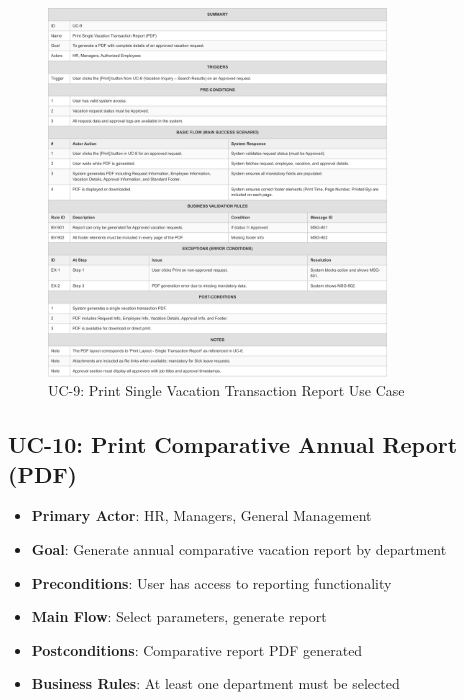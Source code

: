 \documentclass[12pt,a4paper]{article}
\begin{document}
\begin{figure}[H]
\centering
\includegraphics[width=0.8\textwidth]{Use-Cases/UC-9-Print-Single-Vacation-Transaction-Report/UC-9-Print-Single-Vacation-Transaction-Report-1.png}
\caption{UC-9: Print Single Vacation Transaction Report Use Case}
\label{fig:uc9}
\end{figure}

\subsection{UC-10: Print Comparative Annual Report (PDF)}
\begin{itemize}
    \item \textbf{Primary Actor}: HR, Managers, General Management
    \item \textbf{Goal}: Generate annual comparative vacation report by department
    \item \textbf{Preconditions}: User has access to reporting functionality
    \item \textbf{Main Flow}: Select parameters, generate report
    \item \textbf{Postconditions}: Comparative report PDF generated
    \item \textbf{Business Rules}: At least one department must be selected
\end{itemize}
\end{document}
